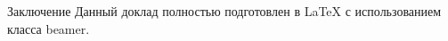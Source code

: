 \begin{block}{Заключение}
  Данный доклад полностью подготовлен
  в \LaTeX{} с использованием класса beamer.
\end{block}